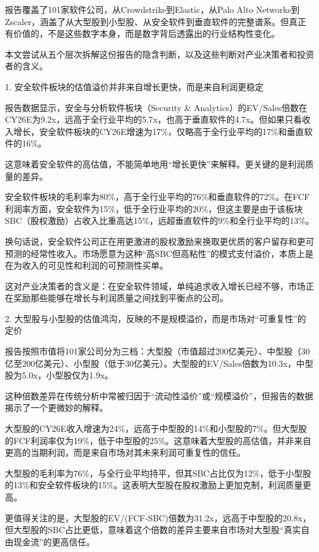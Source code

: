 \documentclass[11pt]{ctexart}
\begin{document}
报告覆盖了101家软件公司，从Crowdstrike到Elastic，从Palo Alto Networks到Zscaler，涵盖了从大型股到小型股、从安全软件到垂直软件的完整谱系。但真正有价值的，不是这些数字本身，而是数字背后透露出的行业结构性变化。

本文尝试从五个层次拆解这份报告的隐含判断，以及这些判断对产业决策者和投资者的含义。

1. 安全软件板块的估值溢价并非来自增长更快，而是来自利润更稳定

报告数据显示，安全与分析软件板块（Security \& Analytics）的EV/Sales倍数在CY26E为9.2x，远高于全行业平均的5.7x，也高于垂直软件的4.7x。但如果只看收入增长，安全软件板块的CY26E增速为17\%，仅略高于全行业平均的17\%和垂直软件的16\%。

这意味着安全软件的高估值，不能简单地用“增长更快”来解释。更关键的是利润质量的差异。

安全软件板块的毛利率为80\%，高于全行业平均的76\%和垂直软件的72\%。在FCF利润率方面，安全软件为15\%，低于全行业平均的20\%，但这主要是由于该板块SBC（股权激励）占收入比重高达15\%，远超垂直软件的9\%和全行业平均的13\%。

换句话说，安全软件公司正在用更激进的股权激励来换取更优质的客户留存和更可预测的经常性收入。市场愿意为这种“高SBC但高粘性”的模式支付溢价，本质上是在为收入的可见性和利润的可预测性买单。

这对产业决策者的含义是：在安全软件领域，单纯追求收入增长已经不够，市场正在奖励那些能够在增长与利润质量之间找到平衡点的公司。

2. 大型股与小型股的估值鸿沟，反映的不是规模溢价，而是市场对“可重复性”的定价

报告按照市值将101家公司分为三档：大型股（市值超过200亿美元）、中型股（30亿至200亿美元）、小型股（低于30亿美元）。大型股的EV/Sales倍数为10.3x，中型股为5.0x，小型股仅为1.9x。

这种倍数差异在传统分析中常被归因于“流动性溢价”或“规模溢价”，但报告的数据揭示了一个更微妙的解释。

大型股的CY26E收入增速为24\%，远高于中型股的14\%和小型股的7\%。但大型股的FCF利润率仅为19\%，低于中型股的25\%。这意味着大型股的高估值，并非来自更高的当期利润，而是来自市场对其未来利润可重复性的信任。

大型股的毛利率为76\%，与全行业平均持平，但其SBC占比仅为12\%，低于小型股的13\%和安全软件板块的15\%。这表明大型股在股权激励上更加克制，利润质量更高。

更值得关注的是，大型股的EV/(FCF-SBC)倍数为31.2x，远高于中型股的20.8x，但大型股的SBC占比更低，意味着这个倍数的差异主要来自市场对大型股“真实自由现金流”的更高信任。
\end{document}
